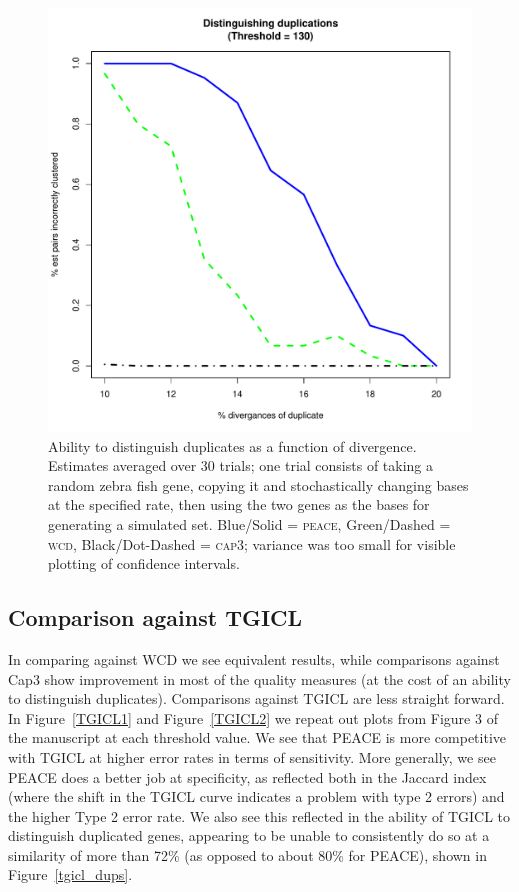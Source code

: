 \documentclass[a4paper,12pt]{article}
\newcommand{\peace} {{\small PEACE}}
\newcommand{\wcd} {{\small WCD}}
\newcommand{\capthree} {{\small Cap3}}
\newcommand{\tgicl} {{\small TGICL}}
\begin{document}
\begin{appendix}
\begin{figure}[tbh]
\centerline{
\includegraphics[scale=0.35]{pics.d/duplicates_130.pdf}
}
\caption{Ability to distinguish duplicates as a function of
  divergence.  Estimates averaged over 30 trials; one trial consists
  of taking a random zebra fish gene, copying it and stochastically changing bases
  at the specified rate, then using the two genes as the bases for
  generating a simulated set. Blue/Solid = \textsc{peace}, Green/Dashed = \textsc{wcd}, Black/Dot-Dashed = \textsc{cap3};
  variance was too small for visible plotting of
  confidence intervals.}\label{dups130}
\end{figure}

\subsection{Comparison against \tgicl}

In comparing against \wcd\/ we see equivalent results,
while comparisons against \capthree\/ show improvement in most of the
quality measures (at the cost of an ability to distinguish
duplicates).  Comparisons against \tgicl\/ \cite{Pertea2003} are less
straight forward.  In Figure~\ref{TGICL1} and Figure~\ref{TGICL2} we
repeat out plots from Figure 3 of the manuscript at each threshold
value.  We see that \peace\/ is more competitive with \tgicl\/ at higher
error rates in terms of sensitivity.  More generally, we see \peace\/
does a better job at specificity, as reflected both in the Jaccard index
(where the shift in the \tgicl\/ curve indicates a problem with type 2 errors) and
the higher Type 2 error rate.  We also see this reflected in the
ability of \tgicl\/ to distinguish duplicated genes, appearing to be unable
to consistently do so at a similarity of more than 72\% (as opposed to
about 80\% for \peace), shown in Figure~\ref{tgicl_dups}.


\end{appendix}
\end{document}
